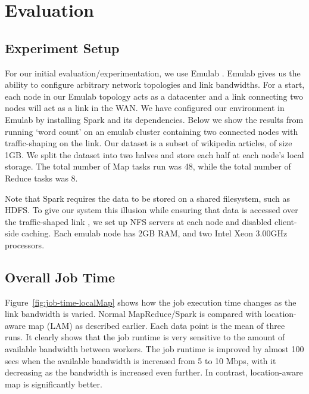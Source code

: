 \section{Evaluation}

\subsection{Experiment Setup}
For our initial evaluation/experimentation, we use Emulab \cite{2}. Emulab gives us the ability to configure arbitrary network topologies and link bandwidths. For a start, each node in our Emulab topology acts as a datacenter and a link connecting two nodes will act as a link in the WAN. We have configured our environment in Emulab by installing Spark and its dependencies.  Below we show the results from running `word count' on an emulab cluster containing two connected nodes with traffic-shaping on the link. Our dataset is a subset of wikipedia articles, of size 1GB. We split the dataset into two halves and store each half at each node's local storage. The total number of Map tasks run was 48, while the total number of Reduce tasks was 8. 

Note that Spark requires the data to be stored on a shared filesystem, such as HDFS. To give our system this illusion while ensuring that data is accessed over the traffic-shaped link , we set up NFS servers at each node and disabled client-side caching. Each emulab node has 2GB RAM, and two Intel Xeon 3.00GHz processors.

\subsection{Overall Job Time}
Figure~\ref{fig:job-time-localMap} shows how the job execution time changes as the link bandwidth is varied. %
Normal MapReduce/Spark is compared with location-aware map (LAM) as described earlier. 
Each data point is the mean of three runs. It clearly shows that the job runtime is very sensitive to the amount of available bandwidth between workers. The job runtime is improved by almost 100 secs when the available bandwidth is increased from 5 to 10 Mbps, with it decreasing as the bandwidth is increased even further.  
In contrast, location-aware map is significantly better.


